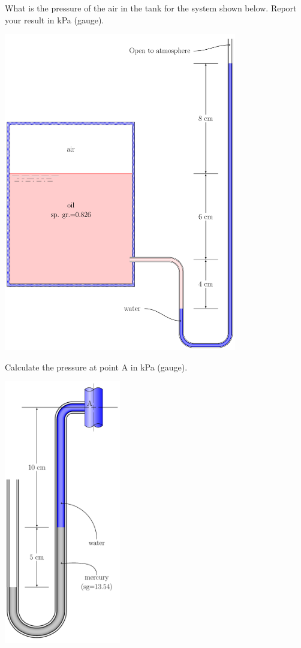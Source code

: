 \documentclass[multi,preview,varwidth=false,border=5,12pt]{standalone}
\begin{document}
\begin{question}
What is the pressure of the air in the tank for the system shown below.  Report your result in kPa (gauge).

\includegraphics[width=4in]{imgs/mono2.pdf}


\begin{solution}
\end{solution}

\end{question}

\begin{question}
Calculate the pressure at point A in kPa (gauge).

\includegraphics[width=2in]{imgs/mono3.pdf}


\begin{solution}
\end{solution}

\end{question}
\end{document}
